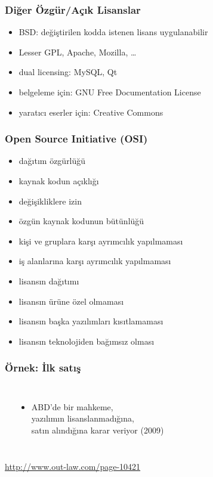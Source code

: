 \documentclass[dvipsnames]{beamer}
\theoremstyle{plain}
\begin{document}
\begin{frame}
  \frametitle{Diğer Özgür/Açık Lisanslar}

  \begin{itemize}
    \item BSD: değiştirilen kodda istenen lisans uygulanabilir
    \item Lesser GPL, Apache, Mozilla, \ldots
    \item dual licensing: MySQL, Qt

    \pause
    \medskip
    \item belgeleme için: GNU Free Documentation License
    \item yaratıcı eserler için: Creative Commons
  \end{itemize}
\end{frame}

\begin{frame}
  \frametitle{Open Source Initiative (OSI)}

  \begin{itemize}
    \item dağıtım özgürlüğü
    \item kaynak kodun açıklığı
    \item değişikliklere izin
    \item özgün kaynak kodunun bütünlüğü
    \item kişi ve gruplara karşı ayrımcılık yapılmaması
    \item iş alanlarına karşı ayrımcılık yapılmaması
    \item lisansın dağıtımı
    \item lisansın ürüne özel olmaması
    \item lisansın başka yazılımları kısıtlamaması
    \item lisansın teknolojiden bağımsız olması
  \end{itemize}
\end{frame}

\begin{frame}
  \frametitle{Örnek: İlk satış}

  \begin{columns}
    \begin{center}
    \end{center}

    \begin{itemize}
      \item ABD'de bir mahkeme,\\
        yazılımın lisanslanmadığına,\\
        satın alındığına karar veriyor (2009)
    \end{itemize}
  \end{columns}

  \medskip
  \tiny{\url{http://www.out-law.com/page-10421}}\\
\end{frame}
\end{document}
